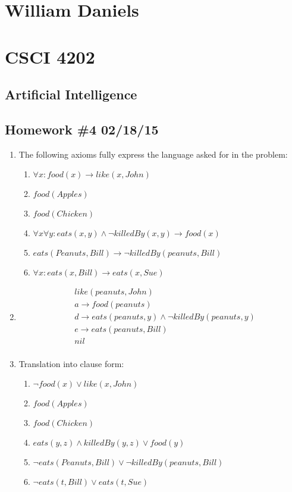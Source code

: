 \documentclass[11pt]{article}
\begin{document}
\begin{center}
\section*{William Daniels}
\section*{CSCI 4202}
\subsection*{Artificial Intelligence}
\subsection*{Homework \#4 02/18/15}
\end{center}

\vspace{.25cm}
\begin{enumerate}
\item The following axioms fully express the language asked for in the problem: 
\begin{enumerate}
\item $\forall x: food(x) \rightarrow like(x, John)$
\item $food(Apples)$
\item $food(Chicken)$
\item $\forall x \forall y : eats(x, y) \land \neg killedBy(x, y) \rightarrow food(x)$
\item $eats(Peanuts, Bill) \rightarrow \neg killedBy(peanuts, Bill)$
\item $\forall x: eats(x, Bill) \rightarrow eats(x, Sue)$
\end{enumerate}
\item 
\begin{align*}
& like(peanuts, John)\\
& a \rightarrow food(peanuts)\\
& d \rightarrow eats(peanuts, y) \land \neg killedBy(peanuts, y)\\
& e \rightarrow eats(peanuts, Bill)\\
& nil\\
\end{align*}
\item Translation into clause form: \\
\begin{enumerate}
\item $ \neg food(x) \vee like(x, John)$
\item $food(Apples)$
\item $food(Chicken)$
\item $ eats(y, z) \land  killedBy(y, z) \vee food(y)$
\item $\neg eats(Peanuts, Bill) \vee \neg killedBy(peanuts, Bill)$
\item $ \neg eats(t, Bill) \vee eats(t, Sue)$
\end{enumerate}
\end{enumerate}
\end{document}
